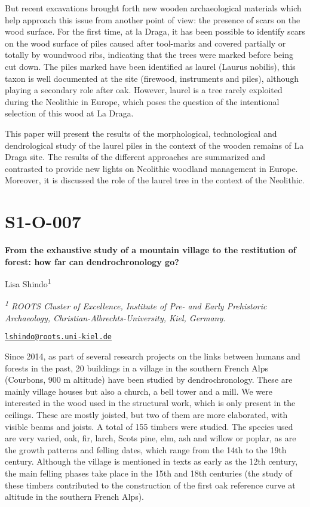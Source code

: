 \documentclass[
]{book}
\begin{document}
But recent excavations brought forth new wooden archaeological materials which help approach this issue from another point of view: the presence of scars on the wood surface. For the first time, at la Draga, it has been possible to identify scars on the wood surface of piles caused after tool-marks and covered partially or totally by woundwood ribs, indicating that the trees were marked before being cut down. The piles marked have been identified as laurel (Laurus nobilis), this taxon is well documented at the site (firewood, instruments and piles), although playing a secondary role after oak. However, laurel is a tree rarely exploited during the Neolithic in Europe, which poses the question of the intentional selection of this wood at La Draga.

This paper will present the results of the morphological, technological and dendrological study of the laurel piles in the context of the wooden remains of La Draga site. The results of the different approaches are summarized and contrasted to provide new lights on Neolithic woodland management in Europe. Moreover, it is discussed the role of the laurel tree in the context of the Neolithic.

\hypertarget{s1-o-007}{%
\section*{S1-O-007}\label{s1-o-007}}

\textbf{From the exhaustive study of a mountain village to the restitution of forest: how far can dendrochronology go?}

Lisa Shindo\textsuperscript{1}

\emph{\textsuperscript{1} ROOTS Cluster of Excellence, Institute of Pre- and Early Prehistoric Archaeology, Christian-Albrechts-University, Kiel, Germany.}

\href{mailto:lshindo@roots.uni-kiel.de}{\nolinkurl{lshindo@roots.uni-kiel.de}}

Since 2014, as part of several research projects on the links between humans and forests in the past, 20 buildings in a village in the southern French Alps (Courbons, 900 m altitude) have been studied by dendrochronology. These are mainly village houses but also a church, a bell tower and a mill. We were interested in the wood used in the structural work, which is only present in the ceilings. These are mostly joisted, but two of them are more elaborated, with visible beams and joists. A total of 155 timbers were studied. The species used are very varied, oak, fir, larch, Scots pine, elm, ash and willow or poplar, as are the growth patterns and felling dates, which range from the 14th to the 19th century. Although the village is mentioned in texts as early as the 12th century, the main felling phases take place in the 15th and 18th centuries (the study of these timbers contributed to the construction of the first oak reference curve at altitude in the southern French Alps).
\end{document}
